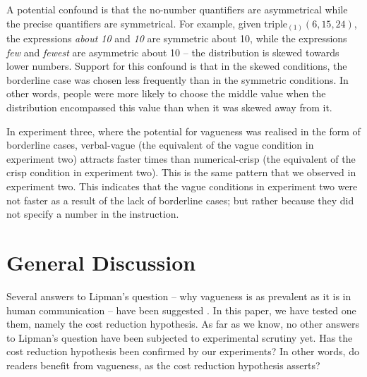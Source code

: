 \documentclass[doc,floatmark]{apa}
\begin{document}
A potential confound is that the no-number quantifiers are asymmetrical while the precise quantifiers are symmetrical. For example, given triple$_{(1)}(6,15,24)$, the expressions \emph{about 10} and \emph{10} are symmetric about 10, while the expressions \emph{few} and \emph{fewest} are asymmetric about 10 -- the distribution is skewed towards lower numbers. Support for this confound is that in the skewed conditions, the borderline case was chosen less frequently than in the symmetric conditions. In other words, people were more likely to choose the middle value when the distribution encompassed this value than when it was skewed away from it. 

In experiment three, where the potential for vagueness was realised in the form of borderline cases, verbal-vague (the equivalent of the vague condition in experiment two) attracts faster times than numerical-crisp (the equivalent of the crisp condition in experiment two). This is the same pattern that we observed in experiment two. This indicates that the vague conditions in experiment two were not faster as a result of the lack of borderline cases; but rather because they did not specify a number in the instruction.

\section{General Discussion}

Several answers to Lipman's question -- why vagueness is as prevalent as it is in human communication -- have been suggested \cite{van2009utility,van2010vagueness}. In this paper, we have tested one them, namely the cost reduction hypothesis. As far as we know, no other answers to Lipman's question have been subjected to experimental scrutiny yet. Has the cost reduction hypothesis been confirmed by our experiments? In other words, do readers benefit from vagueness, as the cost reduction hypothesis asserts?
\end{document}
